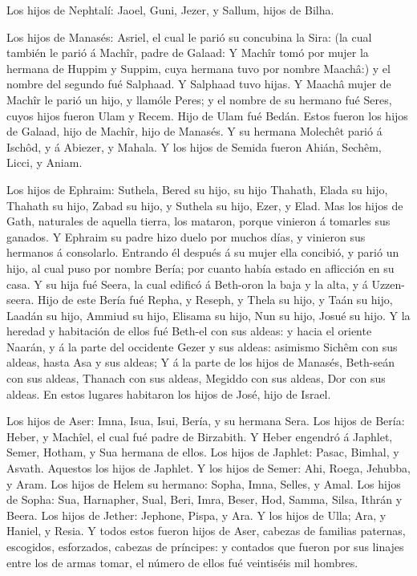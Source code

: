  Los hijos de Nephtalí: Jaoel, Guni, Jezer, y Sallum, hijos
de Bilha.

 Los hijos de Manasés: Asriel, el cual le parió su
concubina la Sira: (la cual también le parió á Machîr, padre de Galaad:
 Y Machîr tomó por mujer la hermana de Huppim y Suppim,
cuya hermana tuvo por nombre Maachâ:) y el nombre del segundo fué
Salphaad. Y Salphaad tuvo hijas.  Y Maachâ mujer de Machîr
le parió un hijo, y llamóle Peres; y el nombre de su hermano fué Seres,
cuyos hijos fueron Ulam y Recem.  Hijo de Ulam fué Bedán.
Estos fueron los hijos de Galaad, hijo de Machîr, hijo de Manasés.
 Y su hermana Molechêt parió á Ischôd, y á Abiezer, y
Mahala.  Y los hijos de Semida fueron Ahián, Sechêm, Licci,
y Aniam.

 Los hijos de Ephraim: Suthela, Bered su hijo, su hijo
Thahath, Elada su hijo, Thahath su hijo,  Zabad su hijo, y
Suthela su hijo, Ezer, y Elad. Mas los hijos de Gath, naturales de
aquella tierra, los mataron, porque vinieron á tomarles sus ganados.
 Y Ephraim su padre hizo duelo por muchos días, y vinieron
sus hermanos á consolarlo.  Entrando él después á su mujer
ella concibió, y parió un hijo, al cual puso por nombre Bería; por
cuanto había estado en aflicción en su casa.  Y su hija fué
Seera, la cual edificó á Beth-oron la baja y la alta, y á Uzzen-seera.
 Hijo de este Bería fué Repha, y Reseph, y Thela su hijo, y
Taán su hijo,  Laadán su hijo, Ammiud su hijo, Elisama su
hijo,  Nun su hijo, Josué su hijo.  Y la
heredad y habitación de ellos fué Beth-el con sus aldeas: y hacia el
oriente Naarán, y á la parte del occidente Gezer y sus aldeas: asimismo
Sichêm con sus aldeas, hasta Asa y sus aldeas;  Y á la
parte de los hijos de Manasés, Beth-seán con sus aldeas, Thanach con sus
aldeas, Megiddo con sus aldeas, Dor con sus aldeas. En estos lugares
habitaron los hijos de José, hijo de Israel.

 Los hijos de Aser: Imna, Isua, Isui, Bería, y su hermana
Sera.  Los hijos de Bería: Heber, y Machîel, el cual fué
padre de Birzabith.  Y Heber engendró á Japhlet, Semer,
Hotham, y Sua hermana de ellos.  Los hijos de Japhlet:
Pasac, Bimhal, y Asvath. Aquestos los hijos de Japhlet.  Y
los hijos de Semer: Ahi, Roega, Jehubba, y Aram.  Los hijos
de Helem su hermano: Sopha, Imna, Selles, y Amal.  Los
hijos de Sopha: Sua, Harnapher, Sual, Beri, Imra,  Beser,
Hod, Samma, Silsa, Ithrán y Beera.  Los hijos de Jether:
Jephone, Pispa, y Ara.  Y los hijos de Ulla; Ara, y Haniel,
y Resia.  Y todos estos fueron hijos de Aser, cabezas de
familias paternas, escogidos, esforzados, cabezas de príncipes: y
contados que fueron por sus linajes entre los de armas tomar, el número
de ellos fué veintiséis mil hombres.

